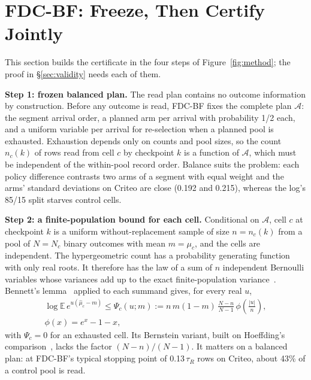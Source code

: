 \documentclass[sigconf,anonymous,review]{acmart}
\newcommand{\cA}{\mathcal{A}}
\begin{document}
\section{FDC-BF: Freeze, Then Certify Jointly}\label{sec:method}

This section builds the certificate in the four steps of Figure~\ref{fig:method}; the proof in \S\ref{sec:validity} needs each of them.

\textbf{Step 1: frozen balanced plan.} The read plan contains no outcome information by construction. Before any outcome is read, FDC-BF fixes the complete plan $\cA$: the segment arrival order, a planned arm per arrival with probability 1/2 each, and a uniform variable per arrival for re-selection when a planned pool is exhausted. Exhaustion depends only on counts and pool sizes, so the count $n_c(k)$ of rows read from cell $c$ by checkpoint $k$ is a function of $\cA$, which must be independent of the within-pool record order. Balance suits the problem: each policy difference contrasts two arms of a segment with equal weight and the arms' standard deviations on Criteo are close (0.192 and 0.215), whereas the log's 85/15 split starves control cells.

\textbf{Step 2: a finite-population bound for each cell.} Conditional on $\cA$, cell $c$ at checkpoint $k$ is a uniform without-replacement sample of size $n = n_c(k)$ from a pool of $N = N_c$ binary outcomes with mean $m = \mu_c$, and the cells are independent. The hypergeometric count has a probability generating function with only real roots. It therefore has the law of a sum of $n$ independent Bernoulli variables whose variances add up to the exact finite-population variance~\citep{vatutin1982limit,tang2023poisson}. Bennett's lemma~\citep{bennett1962probability} applied to each summand gives, for every real $u$,
\begin{equation}\label{eq:cell}
\begin{gathered}
\log \mathbb{E}\, e^{u(\hat\mu_c - m)} \le \Psi_c(u; m) := n\, m(1-m)\,\frac{N-n}{N-1}\,\phi\!\left(\frac{|u|}{n}\right),\\
\phi(x) = e^x - 1 - x,
\end{gathered}
\end{equation}
with $\Psi_c = 0$ for an exhausted cell. Its Bernstein variant, built on Hoeffding's comparison~\citep{hoeffding1963probability}, lacks the factor $(N-n)/(N-1)$. It matters on a balanced plan: at FDC-BF's typical stopping point of 0.13\,$\tau_R$ rows on Criteo, about 43\% of a control pool is read.
\end{document}
